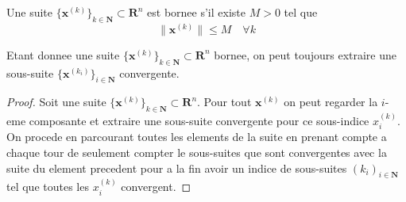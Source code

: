 \begin{definition}
Une suite $\{ \boldsymbol{x}^{(k)} \}_{k\in \mathbf{N}}\subset \mathbf{R}^{n}$ est bornee s'il existe $M>0$ tel que
$$
\lVert \boldsymbol{x}^{(k)} \rVert\leq M\quad\forall k
$$
\end{definition}
\begin{theorem}\label{BW}
Etant donnee une suite $\{ \boldsymbol{x}^{(k)} \}_{k\in \mathbf{N}}\subset \mathbf{R}^{n}$ bornee, on peut toujours extraire une sous-suite $\{ \boldsymbol{x}^{(k_{i})} \}_{i\in \mathbf{N}}$ convergente.
\end{theorem}
\begin{proof}
Soit une suite $\{ \boldsymbol{x}^{(k)} \}_{k\in \mathbf{N}}\subset \mathbf{R}^{n}$. Pour tout $\boldsymbol{x}^{(k)}$ on peut regarder la $i$-eme composante et extraire une sous-suite convergente pour ce sous-indice $x^{(k)}_{i}$. On procede en parcourant toutes les elements de la suite en prenant compte a chaque tour de seulement compter le sous-suites que sont convergentes avec la suite du element precedent pour a la fin avoir un indice de sous-suites $(k_{i})_{i\in \mathbf{N}}$ tel que toutes les $x^{(k)}_{i}$ convergent.
\end{proof}